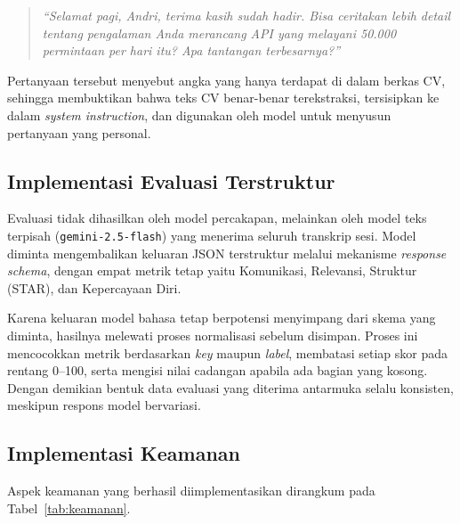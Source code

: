 \documentclass[12pt,a4paper,oneside]{report}
\begin{document}
\begin{quote}
\textit{``Selamat pagi, Andri, terima kasih sudah hadir. Bisa ceritakan lebih
detail tentang pengalaman Anda merancang API yang melayani 50.000 permintaan
per hari itu? Apa tantangan terbesarnya?''}
\end{quote}

Pertanyaan tersebut menyebut angka yang hanya terdapat di dalam berkas CV,
sehingga membuktikan bahwa teks CV benar-benar terekstraksi, tersisipkan ke
dalam \textit{system instruction}, dan digunakan oleh model untuk menyusun
pertanyaan yang personal.

\subsection{Implementasi Evaluasi Terstruktur}

Evaluasi tidak dihasilkan oleh model percakapan, melainkan oleh model teks
terpisah (\texttt{gemini-2.5-flash}) yang menerima seluruh transkrip sesi.
Model diminta mengembalikan keluaran JSON terstruktur melalui mekanisme
\textit{response schema}, dengan empat metrik tetap yaitu Komunikasi,
Relevansi, Struktur (STAR), dan Kepercayaan Diri.

Karena keluaran model bahasa tetap berpotensi menyimpang dari skema yang
diminta, hasilnya melewati proses normalisasi sebelum disimpan. Proses ini
mencocokkan metrik berdasarkan \textit{key} maupun \textit{label},
membatasi setiap skor pada rentang 0--100, serta mengisi nilai cadangan
apabila ada bagian yang kosong. Dengan demikian bentuk data evaluasi yang
diterima antarmuka selalu konsisten, meskipun respons model bervariasi.

\subsection{Implementasi Keamanan}

Aspek keamanan yang berhasil diimplementasikan dirangkum pada
Tabel~\ref{tab:keamanan}.
\end{document}
